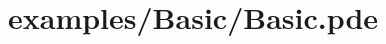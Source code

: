 \hypertarget{examples_2_basic_2_basic_8pde-example}{}\section{examples/\+Basic/\+Basic.\+pde}

\begin{DoxyCodeInclude}
\end{DoxyCodeInclude}
 